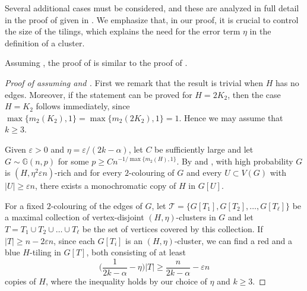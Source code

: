 \documentclass[a4paper,reqno,11pt]{amsart}
\theoremstyle{definition}
\theoremstyle{remark}
\renewcommand\geq{\geqslant}
\renewcommand\ge{\geqslant}
\begin{document}
Several additional cases must be considered, and these are analyzed in full detail in the proof of  given in . We emphasize that, in our proof, it is crucial to control the size of the tilings, which explains the need for the error term $\eta$ in the definition of a cluster.

Assuming , the proof of  is similar to the proof of .

\begin{proof}[Proof of  assuming  and ]

First we remark that the result is trivial when $H$ has no edges. Moreover, if the statement can be proved for $H = 2K_2$, then the case $H = K_2$ follows immediately, since $\max \{m_2(K_2),1\} = \max \{m_2(2K_2),1\} = 1$. Hence we may assume that $k\ge 3$.

Given $\varepsilon>0$ and $\eta=\varepsilon/(2k-\alpha)$, let $C$ be sufficiently large and let $G \sim \mathbb{G}(n,p)$ for some $p \ge Cn^{-1/\max\{m_2(H),1\}}$. By  and , with high probability $G$ is $(H,\eta^2\varepsilon n)$-rich and for every $2$-colouring of $G$ and every $U\subset V(G)$ with $|U|\ge \varepsilon n$, there exists a monochromatic copy of $H$ in $G[U]$.

For a fixed $2$-colouring of the edges of $G$, let $\mathcal{T}=\{G[T_1], G[T_2],\dots, G[T_\ell]\}$
be a maximal collection of vertex-disjoint $(H,\eta)$-clusters in $G$ and let $T = T_1\cup T_2\cup\dots\cup T_\ell$ be the set of vertices covered by this collection. If $|T|\geq n-2\varepsilon n$, since each $G[T_i]$ is an $(H,\eta)$-cluster, we can find a red and a blue $H$-tiling in $G[T]$, both consisting of at least
\begin{equation*}
\Big(\frac{1}{2k-\alpha}-\eta\Big)|T|
\geq \frac{n}{2k-\alpha}-\varepsilon n
\end{equation*}
copies of $H$, where the inequality holds by our choice of $\eta$ and $k \ge 3$.


\end{proof}
\end{document}
